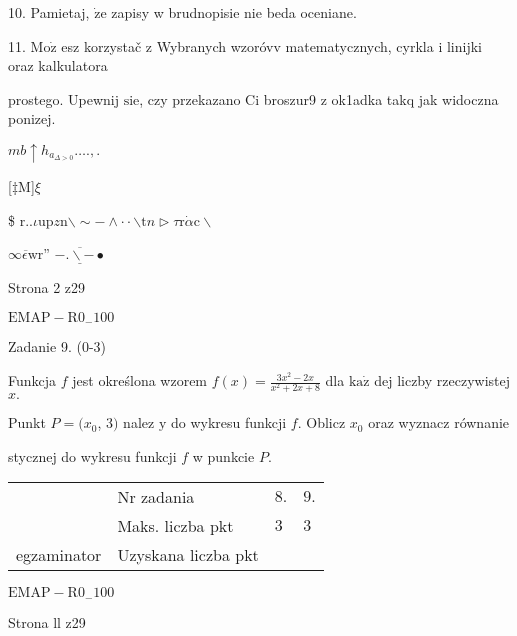 \documentclass[a4paper,12pt]{article}
\begin{document}
10. Pamietaj, $\dot{\mathrm{z}}\mathrm{e}$ zapisy w brudnopisie nie beda oceniane.

11. $\mathrm{M}\mathrm{o}\dot{\mathrm{z}}$ esz korzystač z Wybranych wzoróvv matematycznych, cyrkla i linijki oraz kalkulatora

prostego. Upewnij $\mathrm{s}\mathrm{i}\mathrm{e}$, czy przekazano Ci broszur9 z ok1adka takq jak widoczna ponizej.

$mb\uparrow h_{a_{\Delta>0}}\ldots.,.$

[‡M]$\xi$

{\$} $\mathrm{r}..\iota \mathrm{u}\mathrm{p}z\mathrm{n}\backslash \sim-\wedge\cdot\cdot \backslash \mathrm{t}n\triangleright\tau \mathrm{r}\dot{\alpha}\mathrm{c}\backslash $

$\overline{\infty\epsilon \mathrm{w}\mathrm{r}}$'' $-\underline{\overline{.\backslash -}}\bullet$

Strona 2 z29

$\mathrm{E}\mathrm{M}\mathrm{A}\mathrm{P}-\mathrm{R}0_{-}100$





Zadanie 9. (0-3)

Funkcja $f$ jest określona wzorem $f(x)=\displaystyle \frac{3x^{2}-2x}{x^{2}+2x+8}$ dla $\mathrm{k}\mathrm{a}\dot{\mathrm{z}}$ dej liczby rzeczywistej $x.$

Punkt $P=(x_{0}$, 3$)$ nalez $\mathrm{y}$ do wykresu funkcji $f$. Oblicz $x_{0}$ oraz wyznacz równanie

stycznej do wykresu funkcji $f$ w punkcie $P.$
\begin{center}
\begin{tabular}{|l|l|l|l|}
\cline{2-4}
&	\multicolumn{1}{|l|}{Nr zadania}&	\multicolumn{1}{|l|}{$8.$}&	\multicolumn{1}{|l|}{ $9.$}	\\
\cline{2-4}
&	\multicolumn{1}{|l|}{Maks. liczba pkt}&	\multicolumn{1}{|l|}{$3$}&	\multicolumn{1}{|l|}{ $3$}	\\
\cline{2-4}
\multicolumn{1}{|l|}{egzaminator}&	\multicolumn{1}{|l|}{Uzyskana liczba pkt}&	\multicolumn{1}{|l|}{}&	\multicolumn{1}{|l|}{}	\\
\hline
\end{tabular}

\end{center}
$\mathrm{E}\mathrm{M}\mathrm{A}\mathrm{P}-\mathrm{R}0_{-}100$

Strona ll z29
\end{document}
